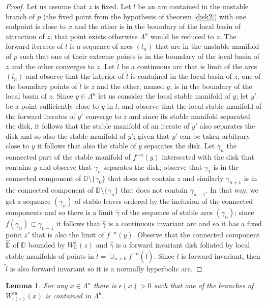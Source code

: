 \documentclass[a4paper,11pt]{article}
\newtheorem{lemma}{Lemma}
\theoremstyle{definition}
\def\DD{{\mathbb D}}
\def\La{\Lambda}
\def\e{\epsilon}
\def\ga{\gamma}
\def\La{\Lambda}
\begin{document}
\begin{proof} Let us assume that $z$ is fixed. Let $l$ be an arc contained in the unstable branch of $p$ (the fixed point from the hypothesis of theorem \ref{disk2}) with one endpoint is close to $x$ and the other is in the boundary of the local basin of attraction of $z$; that point exists otherwise $\La^u$ would be reduced to $z$. The forward iterates of $l$ is  a sequence of arcs $(l_n)$ that are in the unstable manifold of $p$ such that one of their extreme points is in the boundary of the local basin of $z$ and the other converges to $z$. Let $\hat l$ be a continuous arc that is limit of the arcs $(l_n)$ and observe that the interior of $\hat l$ is contained in the local basin of $z$, one  of the boundary points of $\hat l$ is $z$ and the other, named $y$, is in the boundary of the local basin of $z$.  Since $y\in \La^u$ let us consider the local stable manifold of $y$; let  $y'$ be a point sufficiently close to $y$ in $l$,   and observe that the local stable manifold of the  forward iterates of $y'$ converge to  $z$ and since its stable manifold separated the disk, it follows that the stable manifold of an iterate of $y'$ also separates the disk and so also the stable manifold of $y'$; given that $y'$ can be taken arbitrary close to $y$ it follows that also the stable of $y$ separates the disk. Let  $\ga_n$ the connected  part of the stable manifold of $f^{-n}(y)$ intersected with the disk  that contains $y$ and observe that $\ga_n$ separates the disk; observe that $\ga_1$ is in the connected component of $\DD\setminus\{\ga_0\}$ that does not contain $z$ and similarly $\ga_{n+1}$ is in the connected component of $\DD\setminus\{\ga_n\}$ that does not contain  $\ga_{n-1}$. In that way, we get a sequence $(\ga_n)$ of stable leaves ordered by the  inclusion  of the connected components and so there is a limit  $\hat \ga$ of the sequence of stable arcs $(\ga_n)$; since $f(\ga_n)\subset \ga_{n-1}$ it follows that $\hat \ga$ is a continuous invariant arc and so it has a fixed point $z'$ that is also the limit of $f^{-n}(y)$. Observe that the connected component $\hat \DD$ of $\DD$ bounded by $W^s_\DD(z)$ and $\hat \ga$ is a forward invariant disk foliated by local stable manifolds of points in   $\tilde l= \cup_{n>0}f^{-n}(\hat l).$  Since $\hat l$ is forward invariant, then $\tilde  l$  is also forward invariant so it is a normally hyperbolic arc. 


\end{proof}

\begin{lemma}\label{pre-cu-omega} For any $x\in \La^u$ there is $\e(x)>0$ such that one of the branches of $W^{cu}_{\e(x)}(x)$ is contained in $\La^u.$
    
\end{lemma}
\end{document}
